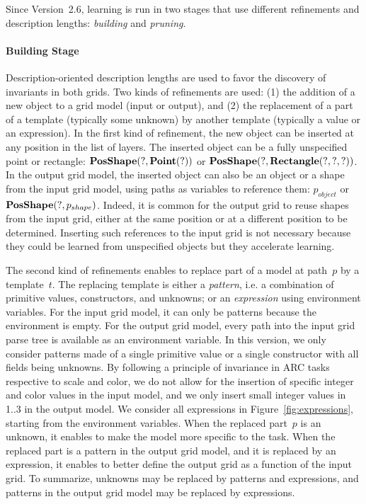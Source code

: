 \documentclass[a4paper]{llncs}
\begin{document}
Since Version~2.6, learning is run in two stages that use different
refinements and description lengths: {\em building} and {\em pruning}.

\paragraph{Building Stage}
Description-oriented description lengths are used to favor the
discovery of invariants in both grids. Two kinds of refinements are
used: (1) the addition of a new object to a grid model (input or
output), and (2) the replacement of a part of a template (typically
some unknown) by another template (typically a value or an
expression).
%
In the first kind of refinement, the new object can be inserted at any
position in the list of layers. The inserted object can be a fully
unspecified point or rectangle: ${\bf PosShape}(?, {\bf Point}(?))$ or
${\bf PosShape}(?, {\bf Rectangle}(?,?,?))$. In the output grid model,
the inserted object can also be an object or a shape from the input
grid model, using paths as variables to reference them: $p_{object}$
or ${\bf PosShape}(?, p_{shape})$. Indeed, it is common for the output
grid to reuse shapes from the input grid, either at the same position
or at a different position to be determined. Inserting such references
to the input grid is not necessary because they could be learned from
unspecified objects but they accelerate learning.

The second kind of refinements enables to replace part of a model at
path~$p$ by a template~$t$. The replacing template is either a {\em
  pattern}, i.e. a combination of primitive values, constructors, and
unknowns; or an {\em expression} using environment variables. For the
input grid model, it can only be patterns because the environment is
empty. For the output grid model, every path into the input grid parse
tree is available as an environment variable.
%
In this version, we only consider patterns made of a single primitive
value or a single constructor with all fields being unknowns. By
following a principle of invariance in ARC tasks respective to scale
and color, we do not allow for the insertion of specific integer and
color values in the input model, and we only insert small integer
values in 1..3 in the output model.
%
We consider all expressions in Figure~\ref{fig:expressions}, starting
from the environment variables.
%
When the replaced part~$p$ is an unknown, it enables to make the model
more specific to the task. When the replaced part is a pattern in the
output grid model, and it is replaced by an expression, it enables to
better define the output grid as a function of the input grid. To
summarize, unknowns may be replaced by patterns and expressions, and
patterns in the output grid model may be replaced by expressions.
\end{document}
